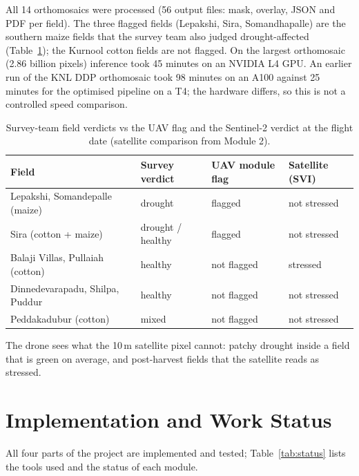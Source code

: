 \documentclass[11pt,a4paper,oneside]{article}
\begin{document}
All 14 orthomosaics were processed (56 output files: mask, overlay, JSON and PDF per field). The three flagged fields (Lepakshi, Sira, Somandhapalle) are the southern maize fields that the survey team also judged drought-affected (Table~\ref{tab:s_uav_short}); the Kurnool cotton fields are not flagged. On the largest orthomosaic (2.86 billion pixels) inference took 45 minutes on an NVIDIA L4 GPU. An earlier run of the KNL DDP orthomosaic took 98 minutes on an A100 against 25 minutes for the optimised pipeline on a T4; the hardware differs, so this is not a controlled speed comparison.

\begin{table}[H]
\centering
\caption{Survey-team field verdicts vs the UAV flag and the Sentinel-2 verdict at the flight date (satellite comparison from Module 2).}
\label{tab:s_uav_short}
\scriptsize
\begin{tabular}{@{}llll@{}}
\toprule
\textbf{Field} & \textbf{Survey verdict} & \textbf{UAV module flag} & \textbf{Satellite (SVI)} \\
\midrule
Lepakshi, Somandepalle (maize) & drought & flagged & not stressed \\
Sira (cotton + maize) & drought / healthy & flagged & not stressed \\
Balaji Villas, Pullaiah (cotton) & healthy & not flagged & stressed \\
Dinnedevarapadu, Shilpa, Puddur & healthy & not flagged & not stressed \\
Peddakadubur (cotton) & mixed & not flagged & not stressed \\
\bottomrule
\end{tabular}
\end{table}
The drone sees what the 10\,m satellite pixel cannot: patchy drought inside a field that is green on average, and post-harvest fields that the satellite reads as stressed.

\section{Implementation and Work Status}
All four parts of the project are implemented and tested; Table~\ref{tab:status} lists the tools used and the status of each module.
\end{document}
